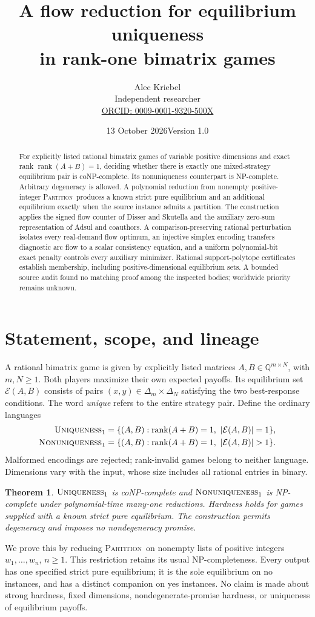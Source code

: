\documentclass[11pt]{article}
\title{A flow reduction for equilibrium uniqueness\\in rank-one bimatrix games}
\author{Alec Kriebel\\Independent researcher\\\small\href{https://orcid.org/0009-0001-9320-500X}{ORCID: 0009-0001-9320-500X}}
\date{13 October 2026\quad Version 1.0}
\newtheorem{theorem}{Theorem}
\theoremstyle{remark}\newtheorem{remark}[theorem]{Remark}
\newcommand{\Q}{\mathbb Q}
\newcommand{\rank}{\operatorname{rank}}
\newcommand{\E}{\mathcal E}
\newcommand{\PART}{\textsc{Partition}}
\newcommand{\UNIQ}{\textsc{Uniqueness}_1}
\newcommand{\NON}{\textsc{Nonuniqueness}_1}
\begin{document}
\maketitle
\begin{abstract}
For explicitly listed rational bimatrix games of variable positive dimensions and exact rank $\rank(A+B)=1$, deciding whether there is exactly one mixed-strategy equilibrium pair is coNP-complete. Its nonuniqueness counterpart is NP-complete. Arbitrary degeneracy is allowed. A polynomial reduction from nonempty positive-integer \PART\ produces a known strict pure equilibrium and an additional equilibrium exactly when the source instance admits a partition. The construction applies the signed flow counter of Disser and Skutella and the auxiliary zero-sum representation of Adsul and coauthors. A comparison-preserving rational perturbation isolates every real-demand flow optimum, an injective simplex encoding transfers diagnostic arc flow to a scalar consistency equation, and a uniform polynomial-bit exact penalty controls every auxiliary minimizer. Rational support-polytope certificates establish membership, including positive-dimensional equilibrium sets. A bounded source audit found no matching proof among the inspected bodies; worldwide priority remains unknown.
\end{abstract}

\section{Statement, scope, and lineage}
A rational bimatrix game is given by explicitly listed matrices $A,B\in\Q^{m\times N}$, with $m,N\ge1$. Both players maximize their own expected payoffs. Its equilibrium set $\E(A,B)$ consists of pairs $(x,y)\in\Delta_m\times\Delta_N$ satisfying the two best-response conditions. The word \emph{unique} refers to the entire strategy pair. Define the ordinary languages
\begin{align*}
\UNIQ&=\{(A,B):\rank(A+B)=1,\ |\E(A,B)|=1\},\\
\NON&=\{(A,B):\rank(A+B)=1,\ |\E(A,B)|>1\}.
\end{align*}
Malformed encodings are rejected; rank-invalid games belong to neither language. Dimensions vary with the input, whose size includes all rational entries in binary.

\begin{theorem}\label{thm:main}
$\UNIQ$ is coNP-complete and $\NON$ is NP-complete under polynomial-time many-one reductions. Hardness holds for games supplied with a known strict pure equilibrium. The construction permits degeneracy and imposes no nondegeneracy promise.
\end{theorem}
We prove this by reducing \PART\ on nonempty lists of positive integers $w_1,\ldots,w_n$, $n\ge1$. This restriction retains its usual NP-completeness. Every output has one specified strict pure equilibrium; it is the sole equilibrium on no instances, and has a distinct companion on yes instances. No claim is made about strong hardness, fixed dimensions, nondegenerate-promise hardness, or uniqueness of equilibrium payoffs.
\end{document}
